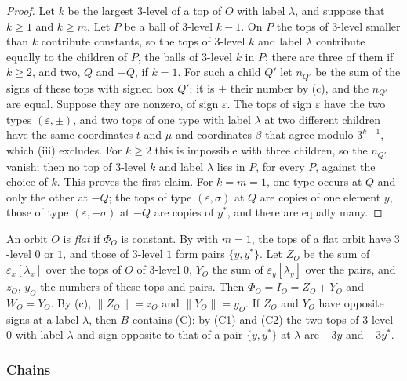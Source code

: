 \begin{proof}
Let $k$ be the largest $3$-level of a top of $O$ with label $\lambda$, and
suppose that $k\ge1$ and $k\ge m$. Let $P$ be a ball of $3$-level $k-1$. On
$P$ the tops of $3$-level smaller than $k$ contribute constants, so the tops
of $3$-level $k$ and label $\lambda$ contribute equally to the children of
$P$, the balls of $3$-level $k$ in $P$; there are three of them if $k\ge2$,
and two, $Q$ and $-Q$, if $k=1$. For such a child $Q'$ let $n_{Q'}$ be the
sum of the signs of these tops with signed box $Q'$; it is $\pm$ their
number by (c), and the $n_{Q'}$ are equal. Suppose they are
nonzero, of sign $\varepsilon$. The tops of sign $\varepsilon$ have the two
types $(\varepsilon,\pm)$, and two tops of one type with label $\lambda$ at
two different children have the same coordinates $t$ and $\mu$ and
coordinates $\beta$ that agree modulo $3^{k-1}$, which
(iii) excludes. For $k\ge2$ this is impossible with
three children, so the $n_{Q'}$ vanish; then no top of $3$-level $k$ and
label $\lambda$ lies in $P$, for every $P$, against the choice of $k$. This
proves the first claim. For $k=m=1$, one type occurs at $Q$ and only the
other at $-Q$; the tops of type $(\varepsilon,\sigma)$ at $Q$ are copies of
one element $y$, those of type $(\varepsilon,-\sigma)$ at $-Q$ are copies
of $y^{*}$, and there are equally many.
\end{proof}

An orbit $O$ is \emph{flat} if $\Phi_{O}$ is constant. By 
with $m=1$, the tops of a flat orbit have $3$-level $0$ or $1$, and those of
$3$-level $1$ form pairs $\{y,y^{*}\}$. Let $Z_{O}$ be the sum of
$\varepsilon_{x}[\lambda_{x}]$ over the tops of $O$ of $3$-level $0$, $Y_{O}$
the sum of $\varepsilon_{y}[\lambda_{y}]$ over the pairs, and $z_{O}$,
$y_{O}$ the numbers of these tops and pairs. Then $\Phi_{O}=I_{O}=Z_{O}+
Y_{O}$ and $W_{O}=Y_{O}$. By (c), $\|Z_{O}\|=z_{O}$ and
$\|Y_{O}\|=y_{O}$. If $Z_{O}$ and $Y_{O}$ have opposite signs at a label
$\lambda$, then $B$ contains (C): by (C1) and (C2) the two tops of
$3$-level $0$ with label $\lambda$ and sign opposite to that of a pair
$\{y,y^{*}\}$ at $\lambda$ are $-3y$ and $-3y^{*}$.

\subsubsection*{Chains}

